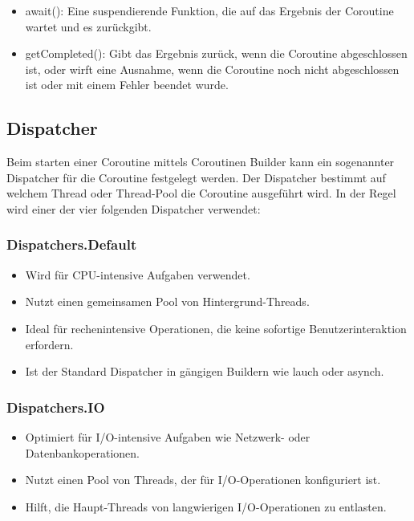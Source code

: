 \documentclass[fontsize=12pt,paper=a4,twoside=semi,parskip=half-,headsepline,headinclude]{scrreprt}
\begin{document}
\begin{itemize}
	\item await(): Eine suspendierende Funktion, die auf das Ergebnis der Coroutine wartet und es zurückgibt.
	\item getCompleted(): Gibt das Ergebnis zurück, wenn die Coroutine abgeschlossen ist, oder wirft eine Ausnahme, wenn die Coroutine noch nicht abgeschlossen ist oder mit einem Fehler beendet wurde.
\end{itemize}

\subsection{Dispatcher}

Beim starten einer Coroutine mittels Coroutinen Builder kann ein sogenannter Dispatcher für die Coroutine festgelegt werden. Der Dispatcher bestimmt auf welchem Thread oder Thread-Pool die Coroutine ausgeführt wird. In der Regel wird einer der vier folgenden Dispatcher verwendet:

\subsubsection{Dispatchers.Default}

\begin{itemize}
	\item Wird für CPU-intensive Aufgaben verwendet.
	\item Nutzt einen gemeinsamen Pool von Hintergrund-Threads.
	\item Ideal für rechenintensive Operationen, die keine sofortige Benutzerinteraktion erfordern.
	\item Ist der Standard Dispatcher in gängigen Buildern wie lauch oder asynch.
\end{itemize}

\subsubsection{Dispatchers.IO}

\begin{itemize}
	\item Optimiert für I/O-intensive Aufgaben wie Netzwerk- oder Datenbankoperationen.
	\item Nutzt einen Pool von Threads, der für I/O-Operationen konfiguriert ist.
	\item Hilft, die Haupt-Threads von langwierigen I/O-Operationen zu entlasten.
\end{itemize}
\end{document}
